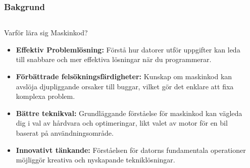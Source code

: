 \begin{frame}[fragile=singleslide]
    \frametitle{Bakgrund}
    \begin{columns}
        \begin{column}{0.75\textwidth}
            \begin{block}{Varför lära sig Maskinkod?}
                \begin{itemize}
                    \item \textbf{Effektiv Problemlösning:} Förstå hur datorer utför uppgifter kan leda till snabbare och mer effektiva lösningar när du programmerar.
                    \pause
                    \item \textbf{Förbättrade felsökningsfärdigheter:} Kunskap om maskinkod kan avslöja djupliggande orsaker till buggar, vilket gör det enklare att fixa komplexa problem.
                    \pause
                    \item \textbf{Bättre teknikval:} Grundläggande förståelse för maskinkod kan vägleda dig i val av hårdvara och optimeringar, likt valet av motor för en bil baserat på användningsområde.
                    \pause
                    \item \textbf{Innovativt tänkande:} Förståelsen för datorns fundamentala operationer möjliggör kreativa och nyskapande tekniklösningar.
                \end{itemize}
            \end{block}
        \end{column}
        \begin{column}{0.25\textwidth}
            \begin{center}
            \end{center}
        \end{column}
    \end{columns}
\end{frame}


